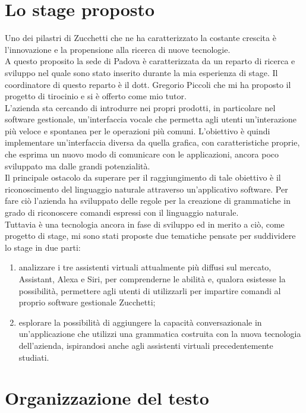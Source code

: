 \section{Lo stage proposto}
Uno dei pilastri di Zucchetti che ne ha caratterizzato la costante crescita è l'innovazione e la propensione alla ricerca di nuove tecnologie. \\
A questo proposito la sede di Padova è caratterizzata da un reparto di ricerca e sviluppo nel quale sono stato inserito durante la mia esperienza di stage. Il coordinatore di questo reparto è il dott. Gregorio Piccoli che mi ha proposto il progetto di tirocinio e si è offerto come mio tutor. \\
L'azienda sta cercando di introdurre nei propri prodotti, in particolare nel software gestionale, un'interfaccia vocale che permetta agli utenti un'interazione più veloce e spontanea per le operazioni più comuni. L'obiettivo è quindi implementare un'interfaccia diversa da quella grafica, con caratteristiche proprie, che esprima un nuovo modo di comunicare con le applicazioni, ancora poco sviluppato ma dalle grandi potenzialità. \\
Il principale ostacolo da superare per il raggiungimento di tale obiettivo è il riconoscimento del linguaggio naturale attraverso un'applicativo software. Per fare ciò l'azienda ha sviluppato delle regole per la creazione di grammatiche in grado di riconoscere comandi espressi con il linguaggio naturale. \\
Tuttavia è una tecnologia ancora in fase di sviluppo ed in merito a ciò, come progetto di stage, mi sono stati proposte due tematiche pensate per suddividere lo stage in due parti:
\begin{enumerate}
	\item analizzare i tre assistenti virtuali attualmente più diffusi sul mercato, Assistant, Alexa e Siri, per comprenderne le abilità e, qualora esistesse la possibilità, permettere agli utenti di utilizzarli per impartire comandi al proprio software gestionale Zucchetti;
	\item esplorare la possibilità di aggiungere la capacità conversazionale in un'applicazione che utilizzi una grammatica costruita con la nuova tecnologia dell'azienda, ispirandosi anche agli assistenti virtuali precedentemente studiati.
\end{enumerate}

\section{Organizzazione del testo}

